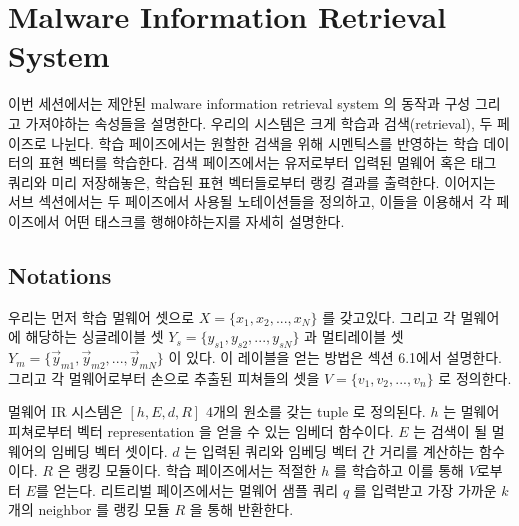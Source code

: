\section{Malware Information Retrieval System}
이번 세션에서는 제안된 malware information retrieval system 의 동작과 구성 그리고 가져야하는 속성들을 설명한다. 우리의 시스템은 크게 학습과 검색(retrieval), 두 페이즈로 나뉜다. 학습 페이즈에서는 원할한 검색을 위해 시멘틱스를 반영하는 학습 데이터의 표현 벡터를 학습한다. 검색 페이즈에서는 유저로부터 입력된 멀웨어 혹은 태그 쿼리와 미리 저장해놓은, 학습된 표현 벡터들로부터 랭킹 결과를 출력한다. 이어지는 서브 섹션에서는 두 페이즈에서 사용될 노테이션들을 정의하고, 이들을 이용해서 각 페이즈에서 어떤 태스크를 행해야하는지를 자세히 설명한다.  


\subsection{Notations}
우리는 먼저 학습 멀웨어 셋으로 $X = \{x_1, x_2, ..., x_N\}$ 를 갖고있다. 그리고 각 멀웨어에 해당하는 싱글레이블 셋 $Y_s = \{y_{s1}, y_{s2}, ..., y_{sN}\}$ 과 멀티레이블 셋 $Y_m = \{\vec{y}_{m1}, \vec{y}_{m2}, ... , \vec{y}_{mN}\}$ 이 있다. 이 레이블을 얻는 방법은 섹션 6.1에서 설명한다. 그리고 각 멀웨어로부터 손으로 추출된 피쳐들의 셋을 $V = \{v_1, v_2, ..., v_n \}$ 로 정의한다. 

멀웨어 IR 시스템은 $[h, E, d, R]$ 4개의 원소를 갖는 tuple 로 정의된다. $h$ 는 멀웨어 피쳐로부터 벡터 representation 을 얻을 수 있는 임베더 함수이다. $E$ 는 검색이 될 멀웨어의 임베딩 벡터 셋이다. $d$ 는 입력된 쿼리와 임베딩 벡터 간 거리를 계산하는 함수이다. $R$ 은 랭킹 모듈이다. 학습 페이즈에서는 적절한 $h$ 를 학습하고 이를 통해 $V$로부터 $E$를 얻는다. 리트리벌 페이즈에서는 멀웨어 샘플 쿼리 $q$ 를 입력받고 가장 가까운 $k$ 개의 neighbor 를 랭킹 모듈 $R$ 을 통해 반환한다.

